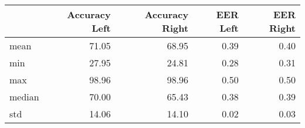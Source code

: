 \begin{tabular}{lrrrr}
\toprule
{} &  Accuracy Left &  Accuracy Right &  EER Left &  EER Right \\
\midrule
mean   &          71.05 &           68.95 &      0.39 &       0.40 \\
min    &          27.95 &           24.81 &      0.28 &       0.31 \\
max    &          98.96 &           98.96 &      0.50 &       0.50 \\
median &          70.00 &           65.43 &      0.38 &       0.39 \\
std    &          14.06 &           14.10 &      0.02 &       0.03 \\
\bottomrule
\end{tabular}
